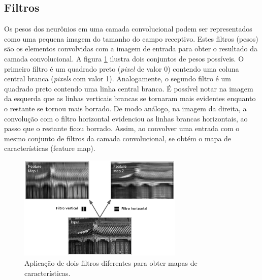 \subsection{Filtros}
Os pesos dos neurônios em uma camada convolucional podem ser representados como uma pequena
imagem do tamanho do campo receptivo. Estes filtros (pesos) são os elementos
convolvidas com a imagem de entrada para obter o resultado da camada convolucional.
A figura \ref{fig:conv_filt} ilustra dois conjuntos de pesos possíveis. O primeiro filtro é um quadrado preto
(\textit{pixel} de valor 0) contendo uma coluna central branca (\textit{pixels} com valor 1). 
Analogamente, o segundo filtro é um quadrado preto contendo uma linha central branca.
É possível notar na imagem da esquerda que as linhas verticais brancas se tornaram mais
evidentes enquanto o restante se tornou mais borrado. De modo análogo, na imagem da direita,
a convolução com o filtro horizontal evidenciou as linhas brancas horizontais, ao passo que
o restante ficou borrado. Assim, ao convolver uma entrada com o mesmo conjunto de filtros
da camada convolucional, se obtém o mapa de características (feature map).
\begin{figure}[htp]
\begin{center}
  \includegraphics[width=0.7\textwidth]{fig/conv_filt}
  \caption{Aplicação de dois filtros diferentes para obter mapas de características.}
  \label{fig:conv_filt}
\end{center}
\end{figure}

